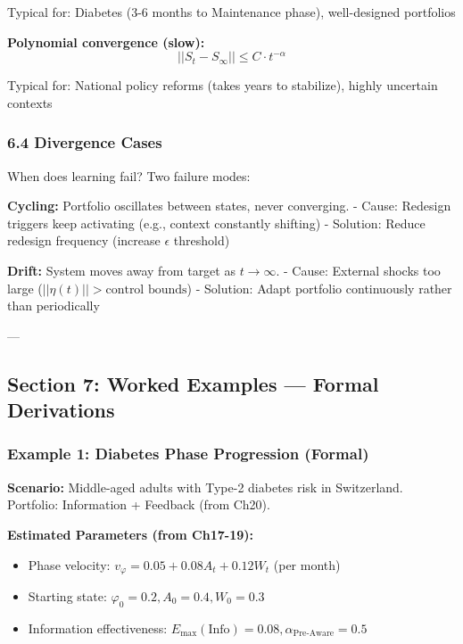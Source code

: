 Typical for: Diabetes (3-6 months to Maintenance phase), well-designed portfolios

\textbf{Polynomial convergence (slow):}
\begin{equation}
||S_t - S_\infty|| \leq C \cdot t^{-\alpha}
\label{eq:kkk-polynomial}
\end{equation}

Typical for: National policy reforms (takes years to stabilize), highly uncertain contexts

\subsubsection*{6.4 Divergence Cases}

When does learning fail? Two failure modes:

\textbf{Cycling:} Portfolio oscillates between states, never converging.
- Cause: Redesign triggers keep activating (e.g., context constantly shifting)
- Solution: Reduce redesign frequency (increase $\epsilon$ threshold)

\textbf{Drift:} System moves away from target as $t \to \infty$.
- Cause: External shocks too large ($||\eta(t)|| > \text{control bounds}$)
- Solution: Adapt portfolio continuously rather than periodically

---

\subsection*{Section 7: Worked Examples — Formal Derivations}
\label{sec:kkk-worked-examples}

\subsubsection*{Example 1: Diabetes Phase Progression (Formal)}

\textbf{Scenario:} Middle-aged adults with Type-2 diabetes risk in Switzerland. Portfolio: Information + Feedback (from Ch20).

\textbf{Estimated Parameters (from Ch17-19):}
\begin{itemize}[nosep]
\item Phase velocity: $v_\varphi = 0.05 + 0.08 A_t + 0.12 W_t$ (per month)
\item Starting state: $\varphi_0 = 0.2, A_0 = 0.4, W_0 = 0.3$
\item Information effectiveness: $E_{\max}(\text{Info}) = 0.08, \alpha_{\text{Pre-Aware}} = 0.5$
\end{itemize}

